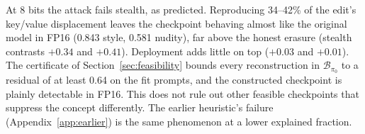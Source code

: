 At 8 bits the attack fails stealth, as predicted. Reproducing 34--42\% of the
edit's key/value displacement leaves the checkpoint behaving almost like the original
model in FP16 (0.843 style, 0.581 nudity), far above the honest erasure (stealth
contrasts $+0.34$ and $+0.41$). Deployment adds little on top ($+0.03$ and $+0.01$).
The certificate of Section~\ref{sec:feasibility} bounds every reconstruction in
$\mathcal{B}_{\pi_0}$ to a residual of at least 0.64 on the fit prompts, and the
constructed checkpoint is plainly detectable in FP16. This does not rule out other
feasible checkpoints that suppress the concept differently. The earlier heuristic's failure (Appendix~\ref{app:earlier}) is
the same phenomenon at a lower explained fraction.

